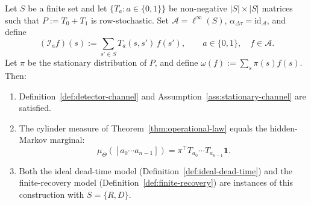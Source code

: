 \begin{proposition}\label{prop:classical-realization}
Let $S$ be a finite set and let $\{T_a:a\in\{0,1\}\}$ be non-negative $|S|\times|S|$ matrices such that $P:=T_0+T_1$ is row-stochastic. Set $\mathcal A=\ell^\infty(S)$, $\alpha_{\Delta\tau}=\mathrm{id}_{\mathcal A}$, and define
\[
(\mathcal I_a f)(s):=\sum_{s'\in S}T_a(s,s')\,f(s'),
\qquad a\in\{0,1\},\quad f\in\mathcal A.
\]
Let $\pi$ be the stationary distribution of $P$, and define $\omega(f):=\sum_{s}\pi(s)f(s)$.
Then:
\begin{enumerate}[label=(\roman*),leftmargin=*,itemsep=2pt]
\item Definition~\ref{def:detector-channel} and Assumption~\ref{ass:stationary-channel} are satisfied.
\item The cylinder measure of Theorem~\ref{thm:operational-law} equals the hidden-Markov marginal:
\begin{equation}\label{eq:bridge-hmm-marginal}
\mu_\Theta([a_0\cdots a_{n-1}])
=
\pi^\top T_{a_0}\cdots T_{a_{n-1}}\mathbf 1.
\end{equation}
\item Both the ideal dead-time model \textup{(}Definition~\ref{def:ideal-dead-time}\textup{)} and the finite-recovery model \textup{(}Definition~\ref{def:finite-recovery}\textup{)} are instances of this construction with $S=\{R,D\}$.
\end{enumerate}
\end{proposition}

